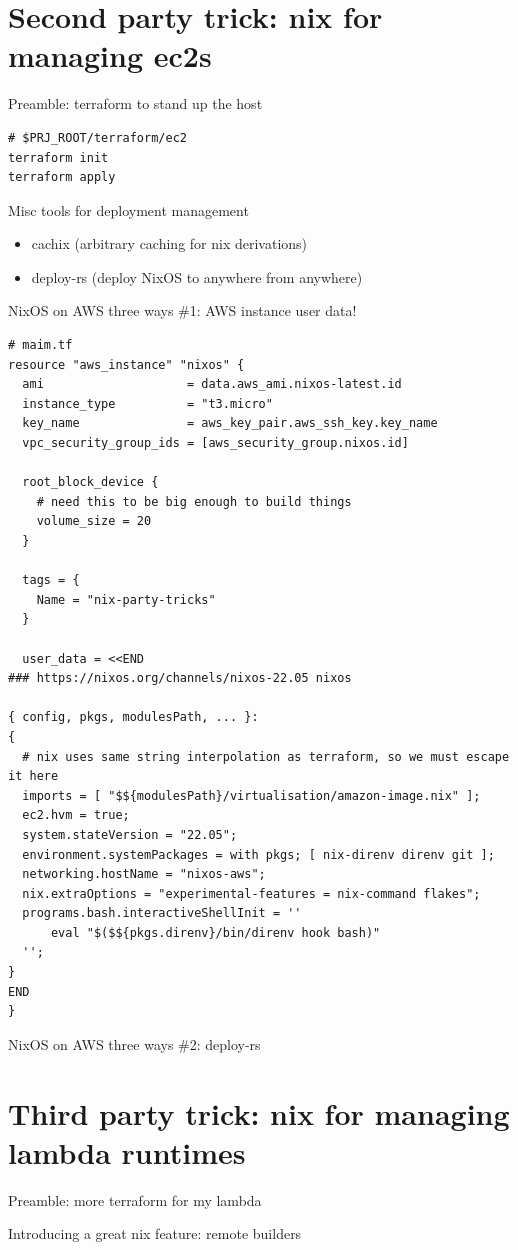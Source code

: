 \documentclass[bigger]{beamer}
\begin{document}
\section{Second party trick: nix for managing ec2s}
\label{sec:orga3f615e}
\begin{frame}[label={sec:org53acbcc},fragile]{Preamble: terraform to stand up the host}
 \begin{verbatim}
# $PRJ_ROOT/terraform/ec2
terraform init
terraform apply
\end{verbatim}
\end{frame}
\begin{frame}[label={sec:org18b9a86}]{Misc tools for deployment management}
\begin{itemize}
\item cachix (arbitrary caching for nix derivations)
\item deploy-rs (deploy NixOS to anywhere from anywhere)
\end{itemize}
\end{frame}
\begin{frame}[label={sec:org7f1c6ed},fragile]{NixOS on AWS three ways}
 \#1: AWS instance user data!
\begin{verbatim}
# maim.tf
resource "aws_instance" "nixos" {
  ami                    = data.aws_ami.nixos-latest.id
  instance_type          = "t3.micro"
  key_name               = aws_key_pair.aws_ssh_key.key_name
  vpc_security_group_ids = [aws_security_group.nixos.id]

  root_block_device {
    # need this to be big enough to build things
    volume_size = 20
  }

  tags = {
    Name = "nix-party-tricks"
  }

  user_data = <<END
### https://nixos.org/channels/nixos-22.05 nixos

{ config, pkgs, modulesPath, ... }:
{
  # nix uses same string interpolation as terraform, so we must escape it here
  imports = [ "$${modulesPath}/virtualisation/amazon-image.nix" ];
  ec2.hvm = true;
  system.stateVersion = "22.05";
  environment.systemPackages = with pkgs; [ nix-direnv direnv git ];
  networking.hostName = "nixos-aws";
  nix.extraOptions = "experimental-features = nix-command flakes";
  programs.bash.interactiveShellInit = ''
      eval "$($${pkgs.direnv}/bin/direnv hook bash)"
  '';
}
END
}
\end{verbatim}
\end{frame}
\begin{frame}[label={sec:orgfdc2885}]{NixOS on AWS three ways}
\#2: deploy-rs
\end{frame}
\section{Third party trick: nix for managing lambda runtimes}
\label{sec:orgc4ca418}
\begin{frame}[label={sec:orgc88e507}]{Preamble: more terraform for my lambda}
\end{frame}
\begin{frame}[label={sec:orgc5c9426}]{Introducing a great nix feature: remote builders}
\end{frame}
\end{document}
